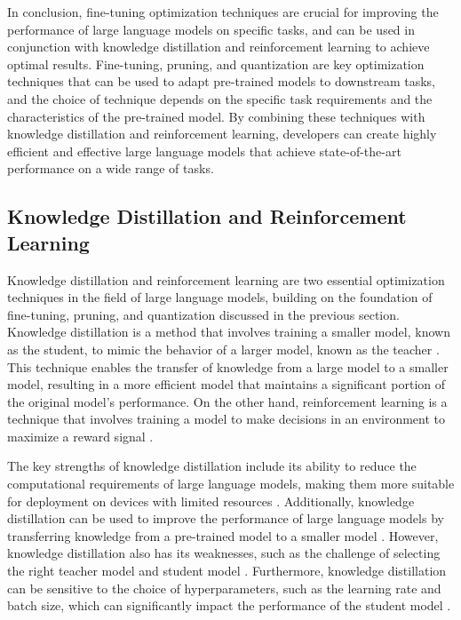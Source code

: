 \documentclass[11pt]{article}
\begin{document}
In conclusion, fine-tuning optimization techniques are crucial for improving the performance of large language models on specific tasks, and can be used in conjunction with knowledge distillation and reinforcement learning to achieve optimal results. Fine-tuning, pruning, and quantization are key optimization techniques that can be used to adapt pre-trained models to downstream tasks, and the choice of technique depends on the specific task requirements and the characteristics of the pre-trained model. By combining these techniques with knowledge distillation and reinforcement learning, developers can create highly efficient and effective large language models that achieve state-of-the-art performance on a wide range of tasks.

\subsection{Knowledge Distillation and Reinforcement Learning}

Knowledge distillation and reinforcement learning are two essential optimization techniques in the field of large language models, building on the foundation of fine-tuning, pruning, and quantization discussed in the previous section. Knowledge distillation is a method that involves training a smaller model, known as the student, to mimic the behavior of a larger model, known as the teacher \cite{ref105}. This technique enables the transfer of knowledge from a large model to a smaller model, resulting in a more efficient model that maintains a significant portion of the original model's performance. On the other hand, reinforcement learning is a technique that involves training a model to make decisions in an environment to maximize a reward signal \cite{ref106}.

The key strengths of knowledge distillation include its ability to reduce the computational requirements of large language models, making them more suitable for deployment on devices with limited resources \cite{ref107}. Additionally, knowledge distillation can be used to improve the performance of large language models by transferring knowledge from a pre-trained model to a smaller model \cite{ref108}. However, knowledge distillation also has its weaknesses, such as the challenge of selecting the right teacher model and student model \cite{ref109}. Furthermore, knowledge distillation can be sensitive to the choice of hyperparameters, such as the learning rate and batch size, which can significantly impact the performance of the student model \cite{ref110}.
\end{document}
